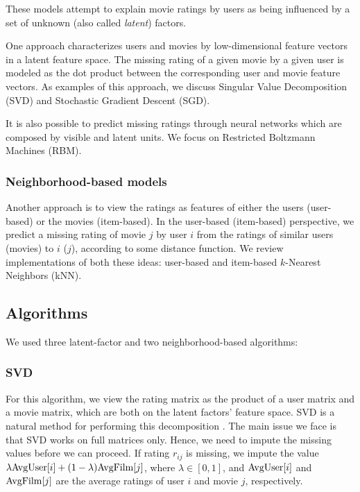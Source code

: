 \documentclass[10pt,conference,compsocconf]{IEEEtran}
\begin{document}
	These models attempt to explain movie ratings by users as being influenced by a set of unknown (also called \emph{latent}) factors.
	
	One approach characterizes users and movies by low-dimensional feature vectors in a latent feature space. The missing rating of a given movie by a given user is modeled as the dot product between the corresponding user and movie feature vectors. As  examples of this approach, we discuss Singular Value Decomposition (SVD) and Stochastic Gradient Descent (SGD).
	
	It is also possible to predict missing ratings through neural networks which are composed by visible and latent units. We focus on Restricted Boltzmann Machines (RBM).
	
	
	\subsubsection*{\textbf{Neighborhood-based models}} 
	Another approach is to view the ratings as features of either the users (user-based) or the movies (item-based). In the user-based (item-based) perspective, we predict a missing rating of movie $j$ by user $i$ from the ratings of similar users (movies) to $i$ ($j$), according to some distance function. We review implementations of both these ideas: user-based and item-based $k$-Nearest Neighbors (kNN).
	
	
	\subsection{Algorithms}
	We used three latent-factor and two neighborhood-based algorithms:
	
	\subsubsection*{\textbf{SVD}} For this algorithm, we view the rating matrix as the product of a user matrix and a movie matrix, which are both on the latent factors' feature space. SVD is a natural method for performing this decomposition \cite{Koren09matrixfactorization}. The main issue we face is that SVD works on full matrices only. Hence, we need to impute the missing values before we can proceed. If rating $r_{ij}$ is missing, we impute the value $\lambda \textnormal{AvgUser}[i] + (1 - \lambda) \textnormal{AvgFilm}[j]$, where $\lambda \in [0,1]$, and $\textnormal{AvgUser}[i]$ and $\textnormal{AvgFilm}[j]$ are the average ratings of user $i$ and movie $j$, respectively. 
	
\end{document}
